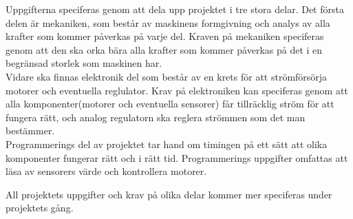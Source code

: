 Uppgifterna speciferas genom att dela upp projektet i tre stora delar. Det första delen är mekaniken, som består av maskinens formgivning och analys av alla krafter som kommer påverkas på varje del. Kraven på mekaniken speciferas genom att den ska orka bära alla krafter som kommer påverkas på det i en begränsad storlek som maskinen har.\\

Vidare ska finnas elektronik del som består av en krets för att strömförsörja motorer och eventuella reglulator. Krav på elektroniken kan speciferas genom att alla komponenter(motorer och eventuella sensorer) får tillräcklig ström för att fungera rätt, och analog regulatorn ska reglera strömmen som det man bestämmer.\\

Programmerings del av projektet tar hand om timingen på ett sätt att olika komponenter fungerar rätt och i rätt tid. Programmerings uppgifter omfattas att läsa av sensorers värde och kontrollera motorer.

All projektets uppgifter och krav på olika delar kommer mer speciferas under projektets gång.